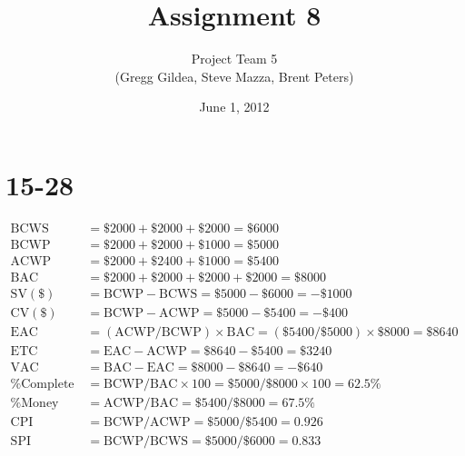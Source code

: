 \documentclass[letterpaper,10pt]{article}
\title{Assignment 8}
\author{Project Team 5 \\ { \small (Gregg Gildea, Steve Mazza, Brent Peters)}}
\date{June 1, 2012}
\begin{document}
\maketitle

\section*{15-28}
\begin{align*}
\mbox{BCWS} &= \$2000+\$2000+\$2000 = \$6000 \\
\mbox{BCWP} &= \$2000+\$2000+\$1000 = \$5000 \\
\mbox{ACWP} &= \$2000+\$2400+\$1000 = \$5400 \\
\mbox{BAC} &= \$2000+\$2000+\$2000+\$2000 = \$8000 \\
\mbox{SV}(\$) &= \mbox{BCWP} - \mbox{BCWS} = \$5000 - \$6000 = -\$1000 \\
\mbox{CV}(\$) &= \mbox{BCWP} - \mbox{ACWP} = \$5000 - \$5400 = -\$400 \\
\mbox{EAC} &= (\mbox{ACWP}/\mbox{BCWP}) \times \mbox{BAC} = (\$5400/\$5000) \times \$8000 = \$8640 \\
\mbox{ETC} &= \mbox{EAC} - \mbox{ACWP} = \$8640 - \$5400 = \$3240 \\
\mbox{VAC} &= \mbox{BAC} - \mbox{EAC} = \$8000 - \$8640 = -\$640 \\
\mbox{\% Complete} &= \mbox{BCWP}/\mbox{BAC} \times 100 = \$5000/\$8000 \times 100 = 62.5\% \\
\mbox{\% Money Spent} &= \mbox{ACWP}/\mbox{BAC} = \$5400/\$8000 = 67.5\% \\
\mbox{CPI} &= \mbox{BCWP}/\mbox{ACWP} = \$5000/\$5400 = 0.926 \\
\mbox{SPI} &= \mbox{BCWP}/\mbox{BCWS} = \$5000/\$6000 = 0.833
\end{align*}
\end{document}

